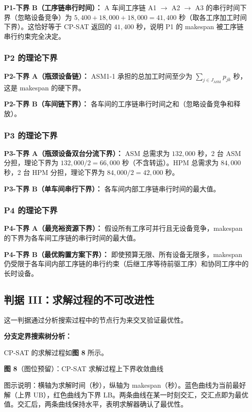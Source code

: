 \documentclass[UTF8,a4paper,12pt]{ctexart}
\begin{document}
\textbf{P1-下界 B（工序链串行时间）：} A 车间工序链 A1 $\to$ A2 $\to$ A3 的串行时间下界（忽略设备竞争）为 $5,400 + 18,000 + 18,000 = 41,400$ 秒（取各工序加工时间下界）。这恰好等于 CP-SAT 返回的 $41,400$ 秒，说明 P1 的 makespan 被工序链串行约束完全决定。

\subsubsection{P2 的理论下界}
\textbf{P2-下界 A（瓶颈设备链）：} ASM1-1 承担的总加工时间至少为 $\sum_{j \in J_{\text{ASM}}} p_{jk}$ 秒，这是 makespan 的硬下界。

\textbf{P2-下界 B（车间链下界）：} 各车间的工序链串行时间之和（忽略设备竞争和释放）。

\subsubsection{P3 的理论下界}
\textbf{P3-下界 A（瓶颈设备双台分流下界）：} ASM 总需求为 $132,000$ 秒，2 台 ASM 分担，理论下界为 $132,000 / 2 = 66,000$ 秒（不含转运）。HPM 总需求为 $84,000$ 秒，2 台 HPM 分担，理论下界为 $84,000 / 2 = 42,000$ 秒。

\textbf{P3-下界 B（单车间串行下界）：} 各车间内部工序链串行时间的最大值。

\subsubsection{P4 的理论下界}
\textbf{P4-下界 A（最充裕资源下界）：} 假设所有工序可并行且无设备竞争，makespan 的下界为各车间工序链的串行时间的最大值。

\textbf{P4-下界 B（最优购置方案下界）：} 即使预算无限、所有设备无限多，makespan 仍受限于各车间内部工序链的串行约束（后继工序等待前驱工序）和协同工序中的长时设备。

\subsection{判据 III：求解过程的不可改进性}
这一判据通过分析搜索过程中的节点行为来交叉验证最优性。

\textbf{分支定界搜索树分析：}

CP-SAT 的求解过程如\textbf{图 8} 所示。

\begin{center}
\textbf{图 8}（图位预留）：CP-SAT 求解过程上下界收敛曲线

图示说明：横轴为求解时间（秒），纵轴为 makespan（秒）。蓝色曲线为当前最好解（上界 UB），红色曲线为下界 LB。两条曲线在某一时刻交汇，交汇点即为最优值。交汇后，两条曲线保持水平，表明求解器确认了最优性。
\end{center}
\end{document}
